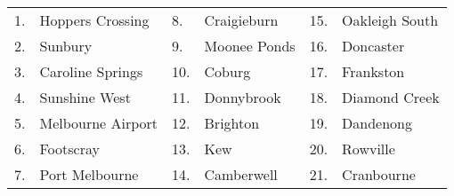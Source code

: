 \begin{tabularx}{0.43\textwidth}{zyzyzy}
  1. & Hoppers Crossing & \phantom{.} 8. & Craigieburn & \phantom{.} 15. & Oakleigh South \\ 
  2. & Sunbury & \phantom{.} 9. & Moonee Ponds & \phantom{.} 16. & Doncaster \\ 
  3. & Caroline Springs & \phantom{.} 10. & Coburg & \phantom{.} 17. & Frankston \\ 
  4. & Sunshine West & \phantom{.} 11. & Donnybrook & \phantom{.} 18. & Diamond Creek \\ 
  5. & Melbourne Airport & \phantom{.} 12. & Brighton & \phantom{.} 19. & Dandenong \\ 
  6. & Footscray & \phantom{.} 13. & Kew & \phantom{.} 20. & Rowville \\ 
  7. & Port Melbourne & \phantom{.} 14. & Camberwell & \phantom{.} 21. & Cranbourne \\ 
  \end{tabularx}
